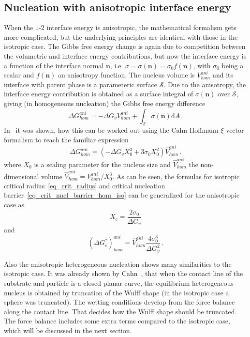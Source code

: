     \subsection{Nucleation with anisotropic interface energy}
    When the $\mathit{1}$-$\mathit{2}$ interface energy is anisotropic, the mathematical formalism gets more complicated, but the underlying principles are identical with those in the isotropic case. The Gibbs free energy change is again due to competition between the volumetric and interface energy contributions, but now the interface energy is a function of the interface normal $\bm{n}$, i.e. $\sigma=\sigma(\bm{n})=\sigma_0f(\bm{n})$, with $\sigma_0$ being a scalar and $f(\bm{n})$ an anisotropy function. The nucleus volume is $V_{hom}^{ani}$ and its interface with parent phase is a parameteric surface $\mathcal{S}$. Due to the anisotropy, the interface energy contribution is obtained as a surface integral of $\sigma(\bm{n})$ over $\mathcal{S}$, giving (in homogeneous nucleation) the Gibbs free energy difference
    \begin{equation}
        \Delta G_{hom}^{ani} = -\Delta G_v V_{hom}^{ani} + \int_{\mathcal{S}}\sigma(\bm{n}) \mathrm{d}A \,.
    \end{equation}
    In~\cite{Mariaux2011} it was shown, how this can be worked out using the Cahn-Hoffmann $\xi$-vector formalism to reach the familiar expression
    \begin{equation} \label{eq_DG_hom_aniso}
        \Delta G_{hom}^{ani} = (-\Delta G_v X_0^3 + 3\sigma_0 X_0^2)\hat{V}_{hom}^{ani} \,.
    \end{equation}
    where $X_0$ is a scaling parameter for the nucleus size and $\hat{V}_{hom}^{ani}$ the non-dimensional volume $\hat{V}_{hom}^{ani}=V_{hom}^{ani}/X_0^3$.
    As can be seen, the formulas for isotropic critical radius~\eqref{eq_crit_radius} and critical nucleation barrier~\eqref{eq_crit_nucl_barrier_hom_iso} can be generalized for the anisotropic case as
    \begin{equation}
        X_c=\frac{2\sigma_0}{\Delta G_v}
    \end{equation}
    and
    \begin{equation}
        (\Delta G^*_c)_{hom}^{ani} = \hat{V}_{hom}^{ani}\frac{4\sigma_0^3}{\Delta G_v^2} \,.
    \end{equation}
    
    Also the anisotropic heterogeneous nucleation shows many similarities to the isotropic case. It was already shown by Cahn~\cite{Cahn1974}, that when the contact line of the substrate and particle is a closed planar curve, the equilibrium heterogeneous nucleus is obtained by truncation of the Wulff shape (in the isotropic case a sphere was truncated). The wetting conditions develop from the force balance along the contact line. That decides how the Wulff shape should be truncated. The force balance includes some extra terms compared to the isotropic case, which will be discussed in the next section.
    
